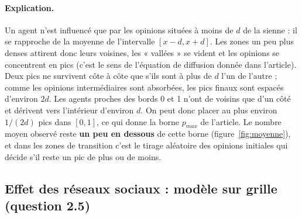 \documentclass[11pt,a4paper]{article}
\begin{document}
\paragraph{Explication.} Un agent n'est influencé que par les opinions situées à moins de $d$
de la sienne : il se rapproche de la moyenne de l'intervalle $[x - d, x + d]$. Les zones un
peu plus denses attirent donc leurs voisines, les « vallées » se vident et les opinions se
concentrent en pics (c'est le sens de l'équation de diffusion donnée dans l'article). Deux pics
ne survivent côte à côte que s'ils sont à plus de $d$ l'un de l'autre ; comme les opinions
intermédiaires sont absorbées, les pics finaux sont espacés d'environ $2d$. Les agents
proches des bords 0 et 1 n'ont de voisins que d'un côté et dérivent vers l'intérieur d'environ
$d$. On peut donc placer au plus environ $1/(2d)$ pics dans $[0, 1]$, ce qui donne la borne
$p_{max}$ de l'article. Le nombre moyen observé reste \textbf{un peu en dessous} de cette
borne (figure~\ref{fig:moyenne}), et dans les zones de transition c'est le tirage aléatoire des
opinions initiales qui décide s'il reste un pic de plus ou de moins.

\subsection{Effet des réseaux sociaux : modèle sur grille (question 2.5)}
\end{document}
